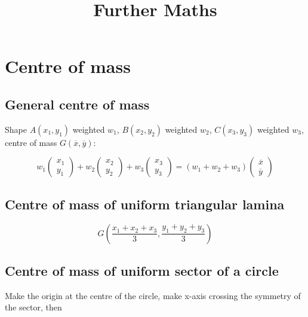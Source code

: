\documentclass[a4paper,9pt]{scrartcl}
\title{Further Maths}
\begin{document}
    \section{Centre of mass}

    \subsection{General centre of mass}

    Shape $A(x_1, y_1)$ weighted $w_1$, $B(x_2, y_2)$ weighted $w_2$, $C(x_3, y_3)$ weighted $w_3$, centre of mass $G(\overline{x}, \overline{y})$:

    \begin{displaymath}
        w_1\begin{pmatrix}
               x_1 \\
               y_1
        \end{pmatrix} +w_2\begin{pmatrix}
                              x_2 \\
                              y_2
        \end{pmatrix}+w_3\begin{pmatrix}
                             x_3 \\
                             y_3
        \end{pmatrix}=(w_1+w_2+w_3)\begin{pmatrix}
                                       \overline{x}\\
                                       \overline{y}
        \end{pmatrix}
    \end{displaymath}

    \subsection{Centre of mass of uniform triangular lamina}

    \begin{displaymath}
        G\left( \frac{x_1+x_2+x_3}{3}, \frac{y_1+y_2+y_3}{3} \right)
    \end{displaymath}

    \subsection{Centre of mass of uniform sector of a circle}

    Make the origin at the centre of the circle, make x-axis crossing the symmetry of the sector, then
\end{document}
